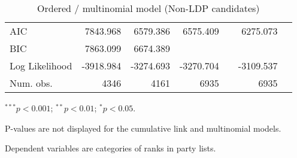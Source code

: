 \begin{table}[htbp]
\begin{center}
{\begin{threeparttable}
\begin{tabular}{l D{.}{.}{5.6} D{.}{.}{5.6} D{.}{.}{5.4} D{.}{.}{2.4} D{.}{.}{5.4} D{.}{.}{2.4}}
AIC                         & 7843.968               & 6579.386                & 6575.409                &                       & 6275.073                &                       \\
BIC                         & 7863.099               & 6674.389                &                         &                       &                         &                       \\
Log Likelihood              & -3918.984              & -3274.693               & -3270.704               &                       & -3109.537               &                       \\
Num. obs.                   & 4346                   & 4161                    & 6935                    &                       & 6935                    &                       \\
\bottomrule
\end{tabular}
\begin{tablenotes}[flushleft]
\scriptsize{
\item $^{***}p<0.001$; $^{**}p<0.01$; $^{*}p<0.05$.\item P-values are not displayed for the cumulative link and multinomial models.
\item Dependent variables are categories of ranks in party lists.}
\end{tablenotes}
\end{threeparttable}
}
\caption{Ordered / multinomial model (Non-LDP candidates)}
\label{table:coefChoiceNonLDP}
\end{center}
\end{table}

